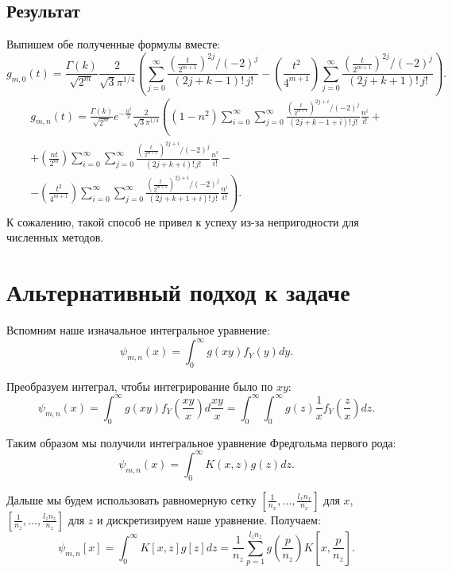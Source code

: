 \documentclass[12pt, a4paper]{report}
\begin{document}
\section{Результат}
Выпишем обе полученные формулы вместе:
\[
    g_{m,0}(t) =
%
    \frac{\Gamma(k)}{\sqrt{2^m}}
    \frac{2}{\sqrt{3} \pi^{1/4}} \left(
%
    \sum_{j=0}^{\infty} \frac{\left(\frac{t}{2^{m+1}}\right)^{2j} / (-2)^j}{(2j+k-1)!\,j!}
-
    \left( \frac{t^2}{4^{m+1}} \right) 
    \sum_{j=0}^{\infty} \frac{\left(\frac{t}{2^{m+1}}\right)^{2j} / (-2)^j}{(2j+k+1)!\,j!}
%
    \right)
.\]
\begin{multline*}
    g_{m,n}(t)
=
    \frac{\Gamma(k)}{\sqrt{2^m}} e^{-\frac{n^2}{2}} \frac{2}{\sqrt{3} \pi^{1/4}} \left(
    \left( 1-n^2 \right) 
    \sum_{i=0}^{\infty} \sum_{j=0}^{\infty} \frac{\left( \frac{t}{2^{m+1}} \right) ^{2j+i} / (-2)^j}{(2j+k-1+i)!\,j!} \frac{n^i}{i!}
\right. +\\+
    \left( \frac{nt}{2^m} \right) 
    \sum_{i=0}^{\infty} \sum_{j=0}^{\infty} \frac{\left( \frac{t}{2^{m+1}} \right) ^{2j+i} / (-2)^j}{(2j+k+i)!\,j!} \frac{n^i}{i!}
-\\- \left.
    \left( \frac{t^2}{4^{m+1}} \right) 
    \sum_{i=0}^{\infty} \sum_{j=0}^{\infty} \frac{\left( \frac{t}{2^{m+1}} \right) ^{2j+i} / (-2)^j}{(2j+k+1+i)!\,j!} \frac{n^i}{i!}
    \right)
.\end{multline*}
%
К сожалению, такой способ не привел к успеху из-за непригодности для численных методов.
%
\chapter{Альтернативный подход к задаче}
Вспомним наше изначальное интегральное уравнение:
\[
    \psi_{m,n}(x) = \int_{0}^{\infty} g(xy) f_Y(y) dy  
.\]

Преобразуем интеграл, чтобы интегрирование было по $xy$:
\[
    \psi_{m,n}(x) = \int_{0}^{\infty}  g(xy) f_Y(\frac{xy}{x}) d\frac{xy}{x}
    = \int_{0}^{\infty} \int_{0}^{\infty} g(z) \frac{1}{x} f_Y(\frac{z}{x}) dz  
.\]

Таким образом мы получили интегральное уравнение Фредгольма первого рода:
\[
    \psi_{m,n}(x) = \int_{0}^{\infty} K(x, z) g(z) dz 
.\]

Дальше мы будем использовать равномерную сетку $\left[\frac{1}{n_x}, \dots, \frac{l_x n_x}{n_x}\right]$ для $x$, $\left[\frac{1}{n_z}, \dots, \frac{l_z n_z}{n_z}\right]$ для $z$ 
и дискретизируем наше уравнение. Получаем:
\[
    \psi_{m,n}[x] = \int_{0}^{\infty} K[x,z] g[z] dz = \frac{1}{n_z} \sum_{p=1}^{l_z n_z} g\left(\frac{p}{n_z}\right) K\left[x, \frac{p}{n_z}\right]
.\]
\end{document}
